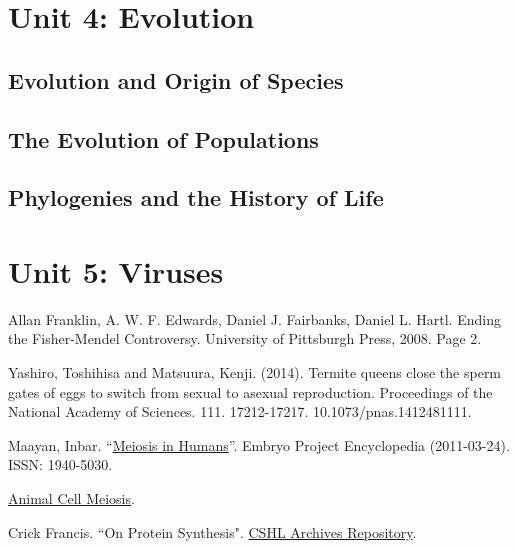 \documentclass[12pt]{article}
\begin{document}
\section{Unit 4: Evolution}
\subsection{Evolution and Origin of Species}
\subsection{The Evolution of Populations}
\subsection{Phylogenies and the History of Life}

\section{Unit 5: Viruses}

\begin{thebibliography}{00}
     Allan Franklin, A. W. F. Edwards, Daniel J. Fairbanks, Daniel L. Hartl. Ending the Fisher-Mendel Controversy. University of Pittsburgh Press, 2008. Page 2.

     Yashiro, Toshihisa and Matsuura, Kenji. (2014). Termite queens close the sperm gates of eggs to switch from sexual to asexual reproduction. Proceedings of the National Academy of Sciences. 111. 17212-17217. 10.1073/pnas.1412481111. 

     Maayan, Inbar. ``\href{http://embryo.asu.edu/handle/10776/2084}{Meiosis in Humans}''. Embryo Project Encyclopedia (2011-03-24). ISSN: 1940-5030. 

     \href{https://www.cellsalive.com/meiosis_js.htm}{Animal Cell Meiosis}.

     Crick Francis. ``On Protein Synthesis". \href{https://libgallery.cshl.edu}{CSHL Archives Repository}.
\end{thebibliography}
\end{document}
